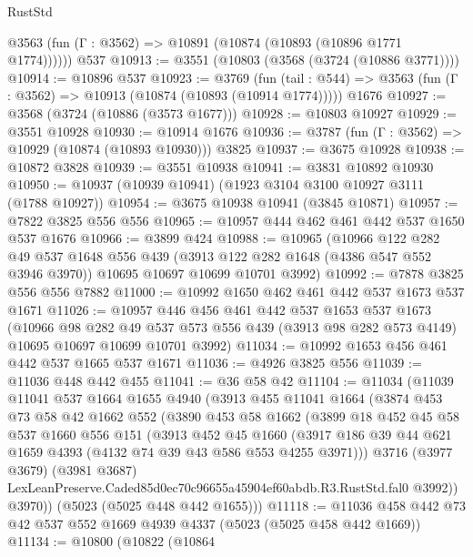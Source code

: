 \begin{lexlean}{RustStd}
\begin{coremodule}
      @3563 (fun (Γ : @3562) => @10891 (@10874 (@10893 (@10896 @1771 @1774))))))
    @537
@10913 := @3551 (@10803 (@3568 (@3724 (@10886 @3771))))
@10914 := @10896 @537
@10923 := @3769
    (fun (tail : @544) => @3563 (fun (Γ : @3562) => @10913 (@10874 (@10893 (@10914 @1774)))))
    @1676
@10927 := @3568 (@3724 (@10886 (@3573 @1677)))
@10928 := @10803 @10927
@10929 := @3551 @10928
@10930 := @10914 @1676
@10936 := @3787 (fun (Γ : @3562) => @10929 (@10874 (@10893 @10930))) @3825
@10937 := @3675 @10928
@10938 := @10872 @3828
@10939 := @3551 @10938
@10941 := @3831 @10892 @10930
@10950 := @10937 (@10939 @10941) (@1923 @3104 @3100 @10927 @3111 (@1788 @10927))
@10954 := @3675 @10938 @10941 (@3845 @10871)
@10957 := @7822 @3825 @556 @556
@10965 := @10957 @444 @462 @461 @442 @537 @1650 @537 @1676
@10966 := @3899 @424
@10988 := @10965
    (@10966
      @122
      @282
      @49
      @537
      @1648
      @556
      @439
      (@3913 @122 @282 @1648 (@4386 @547 @552 @3946 @3970))
      @10695
      @10697
      @10699
      @10701
      @3992)
@10992 := @7878 @3825 @556 @556 @7882
@11000 := @10992 @1650 @462 @461 @442 @537 @1673 @537 @1671
@11026 := @10957
    @446
    @456
    @461
    @442
    @537
    @1653
    @537
    @1673
    (@10966
      @98
      @282
      @49
      @537
      @573
      @556
      @439
      (@3913 @98 @282 @573 @4149)
      @10695
      @10697
      @10699
      @10701
      @3992)
@11034 := @10992 @1653 @456 @461 @442 @537 @1665 @537 @1671
@11036 := @4926 @3825 @556
@11039 := @11036 @448 @442 @455
@11041 := @36 @58 @42
@11104 := @11034
    (@11039
      @11041
      @537
      @1664
      @1655
      @4940
      (@3913
        @455
        @11041
        @1664
        (@3874
          @453
          @73
          @58
          @42
          @1662
          @552
          (@3890
            @453
            @58
            @1662
            (@3899
              @18
              @452
              @45
              @58
              @537
              @1660
              @556
              @151
              (@3913
                @452
                @45
                @1660
                (@3917 @186 @39 @44 @621 @1659 @4393 (@4132 @74 @39 @43 @586 @553 @4255 @3971)))
              @3716
              (@3977 @3679)
              (@3981 @3687)
              LexLeanPreserve.Caded85d0ec70c96655a45904ef60abdb.R3.RustStd.fal0
              @3992))
          @3970))
      (@5023 (@5025 @448 @442 @1655)))
@11118 := @11036 @458 @442 @73 @42 @537 @552 @1669 @4939 @4337 (@5023 (@5025 @458 @442 @1669))
@11134 := @10800
    (@10822
      (@10864

\end{coremodule}
\end{lexlean}
